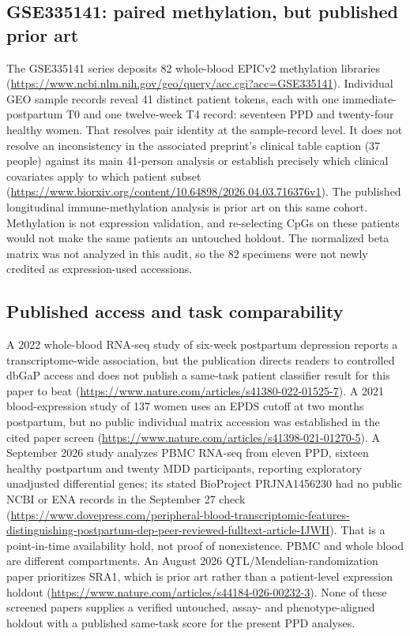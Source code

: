 \documentclass[11pt,a4paper]{article}
\begin{document}
\subsection{GSE335141: paired methylation, but published prior art}
The GSE335141 series deposits 82 whole-blood EPICv2 methylation libraries (\url{https://www.ncbi.nlm.nih.gov/geo/query/acc.cgi?acc=GSE335141}). Individual GEO sample records reveal 41 distinct patient tokens, each with one immediate-postpartum T0 and one twelve-week T4 record: seventeen PPD and twenty-four healthy women. That resolves pair identity at the sample-record level. It does not resolve an inconsistency in the associated preprint's clinical table caption (37 people) against its main 41-person analysis or establish precisely which clinical covariates apply to which patient subset (\url{https://www.biorxiv.org/content/10.64898/2026.04.03.716376v1}). The published longitudinal immune-methylation analysis is prior art on this same cohort. Methylation is not expression validation, and re-selecting CpGs on these patients would not make the same patients an untouched holdout. The normalized beta matrix was not analyzed in this audit, so the 82 specimens were not newly credited as expression-used accessions.

\subsection{Published access and task comparability}
A 2022 whole-blood RNA-seq study of six-week postpartum depression reports a transcriptome-wide association, but the publication directs readers to controlled dbGaP access and does not publish a same-task patient classifier result for this paper to beat (\url{https://www.nature.com/articles/s41380-022-01525-7}). A 2021 blood-expression study of 137 women uses an EPDS cutoff at two months postpartum, but no public individual matrix accession was established in the cited paper screen (\url{https://www.nature.com/articles/s41398-021-01270-5}). A September 2026 study analyzes PBMC RNA-seq from eleven PPD, sixteen healthy postpartum and twenty MDD participants, reporting exploratory unadjusted differential genes; its stated BioProject PRJNA1456230 had no public NCBI or ENA records in the September 27 check (\url{https://www.dovepress.com/peripheral-blood-transcriptomic-features-distinguishing-postpartum-dep-peer-reviewed-fulltext-article-IJWH}). That is a point-in-time availability hold, not proof of nonexistence. PBMC and whole blood are different compartments. An August 2026 QTL/Mendelian-randomization paper prioritizes SRA1, which is prior art rather than a patient-level expression holdout (\url{https://www.nature.com/articles/s44184-026-00232-3}). None of these screened papers supplies a verified untouched, assay- and phenotype-aligned holdout with a published same-task score for the present PPD analyses.
\end{document}
